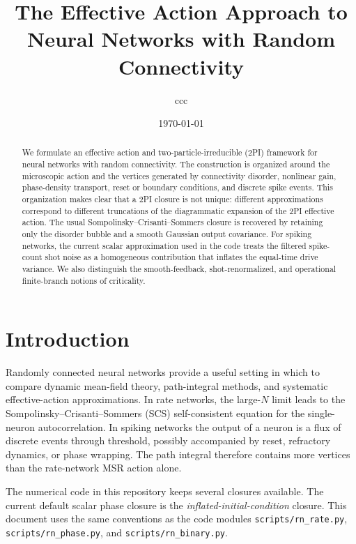 \documentclass[pre,preprint,preprintnumbers,aps,eqsecnum,superscriptaddress,notitlepage,showpacs,floatfix]{revtex4-1}
\begin{document}
\author{ccc}
\address{Mathematical Biology Section, LBM, NIDDK, NIH}
\title{The Effective Action Approach to Neural Networks with Random Connectivity}
\date{\today}

\begin{abstract}
We formulate an effective action and two-particle-irreducible (2PI)
framework for neural networks with random connectivity.  The construction is
organized around the microscopic action and the vertices generated by
connectivity disorder, nonlinear gain, phase-density transport, reset or
boundary conditions, and discrete spike events.  This organization makes clear
that a 2PI closure is not unique: different approximations correspond to
different truncations of the diagrammatic expansion of the 2PI effective
action.  The usual Sompolinsky--Crisanti--Sommers closure is recovered by
retaining only the disorder bubble and a smooth Gaussian output covariance.
For spiking networks, the current scalar approximation used in the code treats
the filtered spike-count shot noise as a homogeneous contribution that inflates
the equal-time drive variance.  We also distinguish the smooth-feedback,
shot-renormalized, and operational finite-branch notions of criticality.
\end{abstract}

\maketitle

\section{Introduction}

Randomly connected neural networks provide a useful setting in which to
compare dynamic mean-field theory, path-integral methods, and systematic
effective-action approximations.  In rate networks, the large-$N$ limit leads
to the Sompolinsky--Crisanti--Sommers (SCS) self-consistent equation for the
single-neuron autocorrelation.  In spiking networks the output of a neuron is
a flux of discrete events through threshold, possibly accompanied by reset,
refractory dynamics, or phase wrapping.  The path integral therefore contains
more vertices than the rate-network MSR action alone.

The numerical code in this repository keeps several closures available.  The
current default scalar phase closure is the \emph{inflated-initial-condition}
closure.  This document uses the same conventions as the code modules
\texttt{scripts/rn\_rate.py}, \texttt{scripts/rn\_phase.py}, and
\texttt{scripts/rn\_binary.py}.
\end{document}
